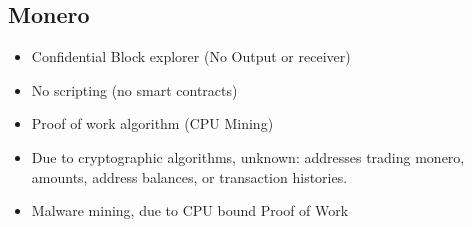 \subsection{Monero}
\begin{itemize}
  \item Confidential Block explorer (No Output or receiver)
  \item No scripting (no smart contracts)
  \item Proof of work algorithm (CPU Mining)
  \item Due to cryptographic algorithms, unknown: addresses trading monero,   amounts, address balances, or transaction histories.
  \item Malware mining, due to CPU bound Proof of Work
\end{itemize}